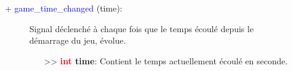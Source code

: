 \documentclass[a4paper, 11pt]{article}
\begin{document}
	\begin{description}
		\item [+ \textcolor{blue}{game\_time\_changed} (time):] Signal déclenché à chaque fois que le temps 
		écoulé depuis le \\démarrage du jeu, évolue.
		\begin{itemize}
			\item [>> \textbf{\textcolor{red}{int} time}:] Contient le temps actuellement écoulé en seconde.
			\\
		\end{itemize}
	\end{description}
\end{document}
